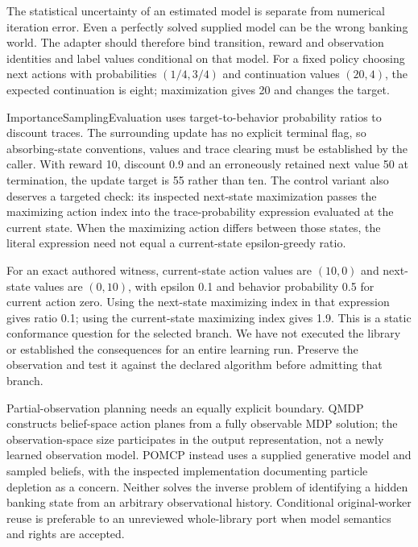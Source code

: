 The statistical uncertainty of an estimated model is separate from numerical iteration error. Even a perfectly solved supplied model can be the wrong banking world. The adapter should therefore bind transition, reward and observation identities and label values conditional on that model. For a fixed policy choosing next actions with probabilities $(1/4,3/4)$ and continuation values $(20,4)$, the expected continuation is eight; maximization gives 20 and changes the target.~\citep{exec24_policycxx_comparison}

ImportanceSamplingEvaluation uses target-to-behavior probability ratios to discount traces. The surrounding update has no explicit terminal flag, so absorbing-state conventions, values and trace clearing must be established by the caller. With reward 10, discount 0.9 and an erroneously retained next value 50 at termination, the update target is 55 rather than ten. The control variant also deserves a targeted check: its inspected next-state maximization passes the maximizing action index into the trace-probability expression evaluated at the current state. When the maximizing action differs between those states, the literal expression need not equal a current-state epsilon-greedy ratio.~\citep{exec24_policycxx_aitoolbox,exec24_policycxx_comparison}

For an exact authored witness, current-state action values are $(10,0)$ and next-state values are $(0,10)$, with epsilon 0.1 and behavior probability 0.5 for current action zero. Using the next-state maximizing index in that expression gives ratio 0.1; using the current-state maximizing index gives 1.9. This is a static conformance question for the selected branch. We have not executed the library or established the consequences for an entire learning run. Preserve the observation and test it against the declared algorithm before admitting that branch.~\citep{exec24_policycxx_aitoolbox,exec24_policycxx_comparison}

Partial-observation planning needs an equally explicit boundary. QMDP constructs belief-space action planes from a fully observable MDP solution; the observation-space size participates in the output representation, not a newly learned observation model. POMCP instead uses a supplied generative model and sampled beliefs, with the inspected implementation documenting particle depletion as a concern. Neither solves the inverse problem of identifying a hidden banking state from an arbitrary observational history. Conditional original-worker reuse is preferable to an unreviewed whole-library port when model semantics and rights are accepted.~\citep{exec24_policycxx_aitoolbox,exec24_policycxx_comparison}


